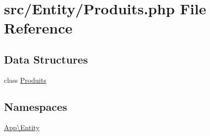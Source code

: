 \hypertarget{_produits_8php}{}\section{src/\+Entity/\+Produits.php File Reference}
\label{_produits_8php}
\subsection*{Data Structures}
\begin{DoxyCompactItemize}
\item 
class \mbox{\hyperlink{class_app_1_1_entity_1_1_produits}{Produits}}
\end{DoxyCompactItemize}
\subsection*{Namespaces}
\begin{DoxyCompactItemize}
\item 
 \mbox{\hyperlink{namespace_app_1_1_entity}{App\textbackslash{}\+Entity}}
\end{DoxyCompactItemize}
